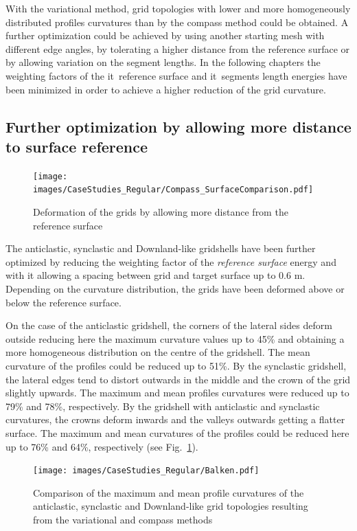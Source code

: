 \documentclass[Thesis.tex]{subfiles}
\begin{document}
With the variational method, grid topologies with lower and more homogeneously distributed profiles curvatures than by the compass method could be obtained. A further optimization could be achieved by using another starting mesh with different edge angles, by tolerating a higher distance from the reference surface or by allowing variation on the segment lengths. In the following chapters the weighting factors of the {it\ reference surface} and {it\ segments length} energies have been minimized in order to achieve a higher reduction of the grid curvature.

\subsection{Further optimization by allowing more distance to surface reference}

\begin{figure}
\centering
\texttt{[image: images/CaseStudies\_Regular/Compass\_SurfaceComparison.pdf]}
\caption{Deformation of the grids by allowing more distance from the reference surface}
\label{fig:Compass_SurfaceComparison}
\end{figure}

The anticlastic, synclastic and Downland-like gridshells have been further optimized by reducing the weighting factor of the {\it reference surface} energy and with it allowing a spacing between grid and target surface up to 0.6 m. Depending on the curvature distribution, the grids have been deformed above or below the reference surface.

On the case of the anticlastic gridshell, the corners of the lateral sides deform outside reducing here the maximum curvature values up to 45\% and obtaining a more homogeneous distribution on the centre of the gridshell. The mean curvature of the profiles could be reduced up to 51\%. By the synclastic gridshell, the lateral edges tend to distort outwards in the middle and the crown of the grid slightly upwards. The maximum and mean profiles curvatures were reduced up to 79\% and 78\%, respectively. By the gridshell with anticlastic and synclastic curvatures, the crowns deform inwards and the valleys outwards getting a flatter surface. The maximum and mean curvatures of the profiles could be reduced here up to 76\% and 64\%, respectively (see Fig.~\ref{fig:Compass_SurfaceComparison}).

\begin{figure}
\centering
\texttt{[image: images/CaseStudies\_Regular/Balken.pdf]}
\caption{Comparison of the maximum and mean profile curvatures of the anticlastic, synclastic and Downland-like grid topologies resulting from the variational and compass methods}
\label{fig:Balken}
\end{figure}
\end{document}
